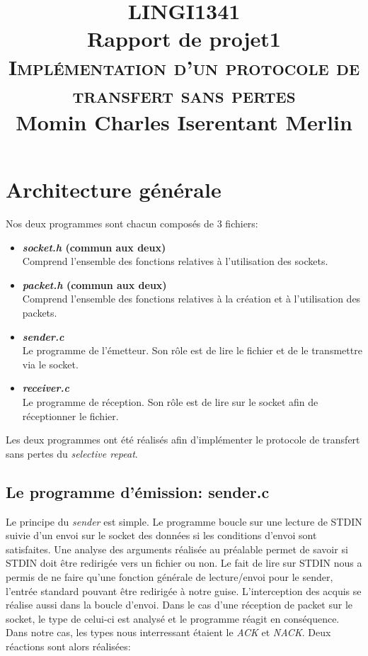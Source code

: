 \documentclass[11pt,a4paper]{article}
\title{\vspace{5cm} \textsc{\Large LINGI1341} \\ Rapport de projet1 \\ \textsc{\LARGE Implémentation d'un protocole de transfert sans pertes } \\ \vspace{3cm} Momin Charles Iserentant Merlin}
\begin{document}
\maketitle

\newpage

\section{Architecture générale}
Nos deux programmes sont chacun composés de 3 fichiers:

\vspace{3mm}

\begin{itemize}
\item{\textbf{\textit{socket.h} (commun aux deux)} \\ Comprend l'ensemble des fonctions relatives à l'utilisation des sockets.}
\item{\textbf{\textit{packet.h} (commun aux deux)} \\Comprend l'ensemble des fonctions relatives à la création et à l'utilisation des packets.}
\item{\textbf{\textit{sender.c}} \\ Le programme de l'émetteur. Son rôle est de lire le fichier et de le transmettre via le socket.}
\item{\textbf{\textit{receiver.c}} \\ Le programme de réception. Son rôle est de lire sur le socket afin de réceptionner le fichier.}
\end{itemize}

\vspace{3mm}

Les deux programmes ont été réalisés afin d'implémenter le protocole de transfert sans pertes du \textit{selective repeat}.

\subsection{Le programme d'émission: \textbf{sender.c}}
Le principe du \textit{sender} est simple. Le programme boucle sur une lecture de STDIN suivie d'un envoi sur le socket des données si les conditions d'envoi sont satisfaites. Une analyse des arguments réalisée au préalable permet de savoir si STDIN doit être redirigée vers un fichier ou non. Le fait de lire sur STDIN nous a permis de ne faire qu'une fonction générale de lecture/envoi pour le sender, l'entrée standard pouvant être redirigée à notre guise. L'interception des acquis se réalise aussi dans la boucle d'envoi. Dans le cas d'une réception de packet sur le socket, le type de celui-ci est analysé et le programme réagit en conséquence. Dans notre cas, les types nous interressant étaient le \textit{ACK} et \textit{NACK}. Deux réactions sont alors réalisées:
\end{document}
